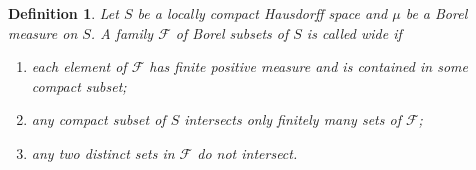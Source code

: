 \documentclass[12pt]{article}
\newtheorem{definition}[theorem]{Definition}
\begin{document}
\begin{definition}\label{WideFamilyDef} Let $S$ be a locally compact Hausdorff
    space and $\mu$ be a Borel measure on $S$. A family $\mathcal{F}$ of Borel
    subsets of $S$ is called wide if
    \begin{enumerate}[label = (\roman*)]
        \item each element of $\mathcal{F}$ has finite positive measure and is
              contained in some compact subset;
        \item  any compact subset of $S$ intersects only finitely many sets of
              $\mathcal{F}$;
        \item  any two distinct sets in $\mathcal{F}$ do not intersect.
    \end{enumerate}
\end{definition}
\end{document}
